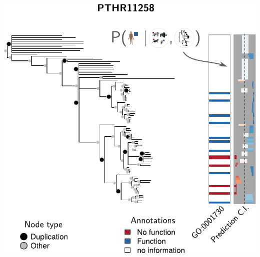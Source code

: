 \documentclass[aspectratio=169,9pt,handout]{beamer}
\begin{document}
\begin{frame}[t, label=aphylo-good]
\begin{minipage}[m]{.65\linewidth}
{			\includegraphics[width=.85\linewidth, clip, trim={0 0 0 1.5cm}]{example-trees-good1-parts-1b.pdf}
		}
	
		
	\end{minipage}
\end{frame}
\end{document}
